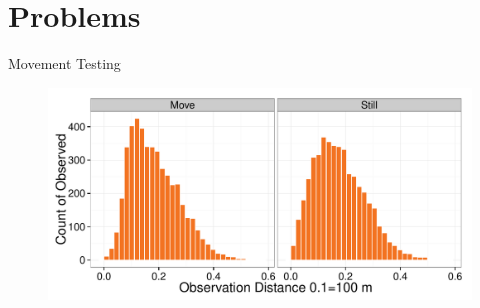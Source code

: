 \documentclass{beamer}
\begin{document}
\section{Problems}

\begin{frame}{Movement Testing}
	\begin{figure}
		\centering
		\includegraphics[width=\textwidth]{../images/movementTest.pdf}
	\end{figure}
\end{frame}
\end{document}

